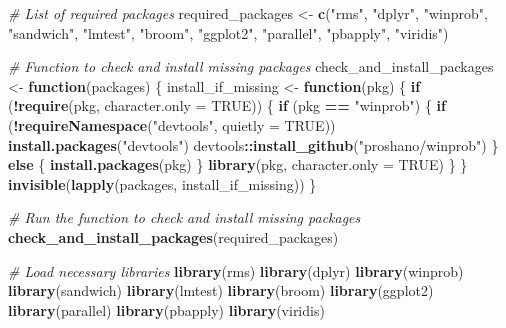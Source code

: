 \documentclass[
  letterpaper,
  DIV=11,
  numbers=noendperiod]{scrartcl}
\newenvironment{Shaded}{\begin{snugshade}}{\end{snugshade}}
\newcommand{\AttributeTok}[1]{\textcolor[rgb]{0.13,0.29,0.53}{#1}}
\newcommand{\CommentTok}[1]{\textcolor[rgb]{0.56,0.35,0.01}{\textit{#1}}}
\newcommand{\ConstantTok}[1]{\textcolor[rgb]{0.56,0.35,0.01}{#1}}
\newcommand{\ControlFlowTok}[1]{\textcolor[rgb]{0.13,0.29,0.53}{\textbf{#1}}}
\newcommand{\FunctionTok}[1]{\textcolor[rgb]{0.13,0.29,0.53}{\textbf{#1}}}
\newcommand{\NormalTok}[1]{#1}
\newcommand{\OtherTok}[1]{\textcolor[rgb]{0.56,0.35,0.01}{#1}}
\newcommand{\SpecialCharTok}[1]{\textcolor[rgb]{0.81,0.36,0.00}{\textbf{#1}}}
\newcommand{\StringTok}[1]{\textcolor[rgb]{0.31,0.60,0.02}{#1}}
\begin{document}
\begin{Shaded}
\begin{Highlighting}[]
\CommentTok{\# List of required packages}
\NormalTok{required\_packages }\OtherTok{\textless{}{-}} \FunctionTok{c}\NormalTok{(}\StringTok{"rms"}\NormalTok{, }\StringTok{"dplyr"}\NormalTok{, }\StringTok{"winprob"}\NormalTok{, }\StringTok{"sandwich"}\NormalTok{, }\StringTok{"lmtest"}\NormalTok{, }\StringTok{"broom"}\NormalTok{, }\StringTok{"ggplot2"}\NormalTok{, }\StringTok{"parallel"}\NormalTok{, }\StringTok{"pbapply"}\NormalTok{, }\StringTok{"viridis"}\NormalTok{)}

\CommentTok{\# Function to check and install missing packages}
\NormalTok{check\_and\_install\_packages }\OtherTok{\textless{}{-}} \ControlFlowTok{function}\NormalTok{(packages) \{}
\NormalTok{  install\_if\_missing }\OtherTok{\textless{}{-}} \ControlFlowTok{function}\NormalTok{(pkg) \{}
    \ControlFlowTok{if}\NormalTok{ (}\SpecialCharTok{!}\FunctionTok{require}\NormalTok{(pkg, }\AttributeTok{character.only =} \ConstantTok{TRUE}\NormalTok{)) \{}
      \ControlFlowTok{if}\NormalTok{ (pkg }\SpecialCharTok{==} \StringTok{"winprob"}\NormalTok{) \{}
        \ControlFlowTok{if}\NormalTok{ (}\SpecialCharTok{!}\FunctionTok{requireNamespace}\NormalTok{(}\StringTok{"devtools"}\NormalTok{, }\AttributeTok{quietly =} \ConstantTok{TRUE}\NormalTok{)) }\FunctionTok{install.packages}\NormalTok{(}\StringTok{"devtools"}\NormalTok{)}
\NormalTok{        devtools}\SpecialCharTok{::}\FunctionTok{install\_github}\NormalTok{(}\StringTok{"proshano/winprob"}\NormalTok{)}
\NormalTok{      \} }\ControlFlowTok{else}\NormalTok{ \{}
        \FunctionTok{install.packages}\NormalTok{(pkg)}
\NormalTok{      \}}
      \FunctionTok{library}\NormalTok{(pkg, }\AttributeTok{character.only =} \ConstantTok{TRUE}\NormalTok{)}
\NormalTok{    \}}
\NormalTok{  \}}
  \FunctionTok{invisible}\NormalTok{(}\FunctionTok{lapply}\NormalTok{(packages, install\_if\_missing))}
\NormalTok{\}}

\CommentTok{\# Run the function to check and install missing packages}
\FunctionTok{check\_and\_install\_packages}\NormalTok{(required\_packages)}

\CommentTok{\# Load necessary libraries}
\FunctionTok{library}\NormalTok{(rms)}
\FunctionTok{library}\NormalTok{(dplyr)}
\FunctionTok{library}\NormalTok{(winprob)}
\FunctionTok{library}\NormalTok{(sandwich)}
\FunctionTok{library}\NormalTok{(lmtest)}
\FunctionTok{library}\NormalTok{(broom)}
\FunctionTok{library}\NormalTok{(ggplot2)}
\FunctionTok{library}\NormalTok{(parallel)}
\FunctionTok{library}\NormalTok{(pbapply)}
\FunctionTok{library}\NormalTok{(viridis)}
\end{Highlighting}
\end{Shaded}
\end{document}
